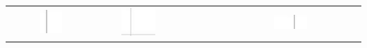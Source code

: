 \documentclass[10pt]{article}
\begin{document}
\begin{center}
\begin{tabular}{|c|c|c|c|c|c|c|c|c|c|c|c|c|c|c|c|c|c|c|c|c|c|c|c|c|c|c|}
\hline
 &  &  & \includegraphics[max width=\textwidth]{2024_11_21_d51d653f4fe4a5bb0c33g-15(9)}
 &  &  &  &  &  & \includegraphics[max width=\textwidth]{2024_11_21_d51d653f4fe4a5bb0c33g-15(2)}
 &  &  &  &  &  &  &  &  &  &  &  & \includegraphics[max width=\textwidth]{2024_11_21_d51d653f4fe4a5bb0c33g-15(1)}

\end{tabular}
\end{center}
\end{document}
